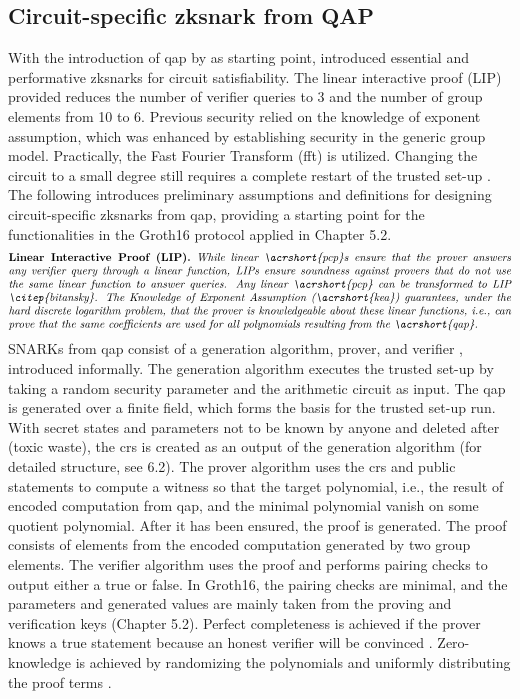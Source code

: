 \subsection{Circuit-specific \acrshort{zksnark} from QAP}
With the introduction of \acrshort{qap} by \citet{GennaroLinPCP} as starting point, \citet{Groth2016OnTS} introduced essential and performative \acrshort{zksnark}s for circuit satisfiability. The linear interactive proof (LIP) provided reduces the number of verifier queries to 3 and the number of group elements from 10 to 6. Previous security relied on the knowledge of exponent assumption, which was enhanced by establishing security in the generic group model. Practically, the Fast Fourier Transform (\acrshort{fft}) is utilized. Changing the circuit to a small degree still requires a complete restart of the trusted set-up \citep{Thaler}. The following introduces preliminary assumptions and definitions for designing circuit-specific \acrshort{zksnark}s from \acrshort{qap}, providing a starting point for the functionalities in the Groth16 protocol applied in Chapter 5.2.
\begin{align*}
    \text{\parbox{450pt}{\textbf{Linear Interactive Proof (LIP).} \textit{While linear \acrshort{pcp}s ensure that the prover answers any verifier query through a linear function, LIPs ensure soundness against provers that do not use the same linear function to answer queries. Any linear \acrshort{pcp} can be transformed to LIP \citep{bitansky}. The Knowledge of Exponent Assumption (\acrshort{kea}) guarantees, under the hard discrete logarithm problem, that the prover is knowledgeable about these linear functions, i.e., can prove that the same coefficients are used for all polynomials resulting from the \acrshort{qap}.}}}
\end{align*}
SNARKs from \acrshort{qap} consist of a generation algorithm, prover, and verifier \citep{Groth2016OnTS, Guo, Benamara}, introduced informally.
The generation algorithm executes the trusted set-up by taking a random security parameter and the arithmetic circuit as input. The \acrshort{qap} is generated over a finite field, which forms the basis for the trusted set-up run. With secret states and parameters not to be known by anyone and deleted after (toxic waste), the \acrshort{crs} is created as an output of the generation algorithm (for detailed structure, see 6.2). The prover algorithm uses the \acrshort{crs} and public statements to compute a witness so that the target polynomial, i.e., the result of encoded computation from \acrshort{qap}, and the minimal polynomial vanish on some quotient polynomial. After it has been ensured, the proof is generated. The proof consists of elements from the encoded computation generated by two group elements. The verifier algorithm uses the proof and performs pairing checks to output either a true or false. In Groth16, the pairing checks are minimal, and the parameters and generated values are mainly taken from the proving and verification keys (Chapter 5.2). Perfect completeness is achieved if the prover knows a true statement because an honest verifier will be convinced \citep{Guo}. Zero-knowledge is achieved by randomizing the polynomials and uniformly distributing the proof terms \citep{Groth2016OnTS, Groth2010ShortPN}.


